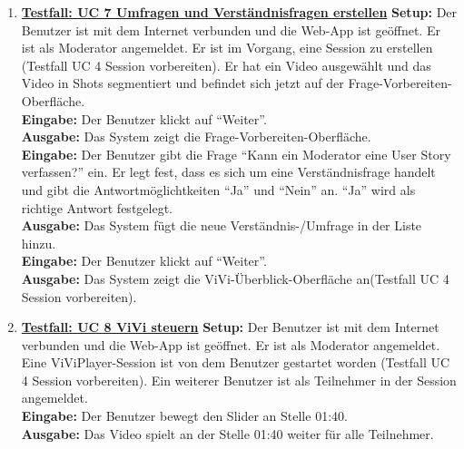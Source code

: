 \begin{enumerate}
	\item \underline{\textbf{Testfall: UC 7 Umfragen und Verständnisfragen erstellen}} \linebreak
	\textbf{Setup:} Der Benutzer ist mit dem Internet verbunden und die Web-App ist geöffnet. Er ist als Moderator angemeldet. Er ist im Vorgang, eine Session zu erstellen (Testfall UC 4 Session vorbereiten). Er hat ein Video ausgewählt und das Video in Shots segmentiert und befindet sich jetzt auf der Frage-Vorbereiten-Oberfläche.\\
	\textbf{Eingabe:} Der Benutzer klickt auf ``Weiter''. \\
	\textbf{Ausgabe:} Das System zeigt die Frage-Vorbereiten-Oberfläche.\\ 
	\textbf{Eingabe:} Der Benutzer gibt die Frage ``Kann ein Moderator eine User Story verfassen?'' ein. Er legt fest, dass es sich um eine Verständnisfrage handelt und gibt die Antwortmöglichtkeiten ``Ja'' und ``Nein'' an. ``Ja'' wird als richtige Antwort festgelegt.\\
	\textbf{Ausgabe:} Das System fügt die neue Verständnis-/Umfrage in der Liste hinzu. \\
	\textbf{Eingabe:} Der Benutzer klickt auf ``Weiter''.\\
	\textbf{Ausgabe:} Das System zeigt die ViVi-Überblick-Oberfläche an(Testfall UC 4 Session vorbereiten).

	\item \underline{\textbf{Testfall: UC 8 ViVi steuern}} \linebreak
	\textbf{Setup:} Der Benutzer ist mit dem Internet verbunden und die Web-App ist geöffnet. Er ist als Moderator angemeldet. Eine ViViPlayer-Session ist von dem Benutzer gestartet worden (Testfall UC 4 Session vorbereiten). Ein weiterer Benutzer ist als Teilnehmer in der Session angemeldet. \\
	\textbf{Eingabe:} Der Benutzer bewegt den Slider an Stelle 01:40. \\
	\textbf{Ausgabe:} Das Video spielt an der Stelle 01:40 weiter für alle Teilnehmer.\\
	

\end{enumerate}
